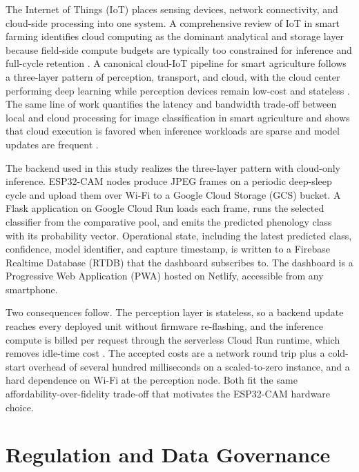 The Internet of Things (IoT) places sensing devices, network connectivity, and cloud-side processing into one system. A comprehensive review of IoT in smart farming identifies cloud computing as the dominant analytical and storage layer because field-side compute budgets are typically too constrained for inference and full-cycle retention \cite{boursianis2022iot}. A canonical cloud-IoT pipeline for smart agriculture follows a three-layer pattern of perception, transport, and cloud, with the cloud center performing deep learning while perception devices remain low-cost and stateless \cite{yu2025cloudedge}. The same line of work quantifies the latency and bandwidth trade-off between local and cloud processing for image classification in smart agriculture and shows that cloud execution is favored when inference workloads are sparse and model updates are frequent \cite{markovic2024cloudfog}.

The backend used in this study realizes the three-layer pattern with cloud-only inference. ESP32-CAM nodes produce JPEG frames on a periodic deep-sleep cycle and upload them over Wi-Fi to a Google Cloud Storage (GCS) bucket. A Flask application on Google Cloud Run loads each frame, runs the selected classifier from the comparative pool, and emits the predicted phenology class with its probability vector. Operational state, including the latest predicted class, confidence, model identifier, and capture timestamp, is written to a Firebase Realtime Database (RTDB) that the dashboard subscribes to. The dashboard is a Progressive Web Application (PWA) hosted on Netlify, accessible from any smartphone.

Two consequences follow. The perception layer is stateless, so a backend update reaches every deployed unit without firmware re-flashing, and the inference compute is billed per request through the serverless Cloud Run runtime, which removes idle-time cost \cite{yu2025cloudedge}. The accepted costs are a network round trip plus a cold-start overhead of several hundred milliseconds on a scaled-to-zero instance, and a hard dependence on Wi-Fi at the perception node. Both fit the same affordability-over-fidelity trade-off that motivates the ESP32-CAM hardware choice.

\section{Regulation and Data Governance}

